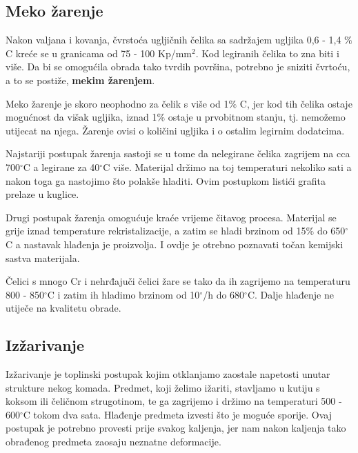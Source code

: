 \documentclass[a4paper,12pt]{article}
\numberwithin{figure}{section}
\begin{document}
\subsection{Meko žarenje}
Nakon valjana i kovanja, čvrstoća ugljičnih čelika sa sadržajem ugljika 0,6 - 1,4 $\%$ C kreće se u granicama od 75 - 100 Kp/mm$^{2}$. Kod legiranih čelika to zna biti i više. Da bi se omogućila obrada tako tvrdih površina, potrebno je sniziti čvrtoću, a to se postiže, \textbf{mekim žarenjem}.\par
Meko žarenje je skoro neophodno za čelik s više od 1$\%$ C, jer kod tih čelika ostaje mogućnost da višak ugljika, iznad 1$\%$ ostaje u prvobitnom stanju, tj. nemožemo utijecat na njega. Žarenje ovisi o količini ugljika i o ostalim legirnim dodatcima.\par 
Najstariji postupak žarenja sastoji se u tome da nelegirane čelika zagrijem na cca 700$^{\circ}$C a legirane za 40$^{\circ}$C više. Materijal držimo na toj temperaturi nekoliko sati a nakon toga ga nastojimo što polakše hladiti. Ovim postupkom listići grafita prelaze u kuglice. \par
Drugi postupak žarenja omogućuje kraće vrijeme čitavog procesa. Materijal se grije iznad temperature rekristalizacije, a zatim se hladi brzinom od 15$\%$ do 650$^{\circ}$C  a nastavak hlađenja je proizvolja. I ovdje je otrebno poznavati točan kemijski sastva materijala.\par
Čelici s mnogo Cr i nehrđajuči čelici žare se tako da ih zagrijemo na temperaturu 800 - 850$^{\circ}$C  i zatim ih hladimo brzinom od 10$^{\circ}$/h do 680$^{\circ}$C. Dalje hlađenje ne utiječe na kvalitetu obrade.
\subsection{Izžarivanje}
Izžarivanje je toplinski postupak kojim otklanjamo zaostale napetosti unutar strukture nekog komada. Predmet, koji želimo ižariti, stavljamo u kutiju s koksom ili čeličnom strugotinom, te ga zagrijemo i držimo na temperaturi 500 - 600$^{\circ}$C  tokom dva sata. Hlađenje predmeta izvesti što je moguće sporije. Ovaj postupak je potrebno provesti prije svakog kaljenja, jer nam nakon kaljenja tako obrađenog predmeta zaosaju neznatne deformacije.
\end{document}
